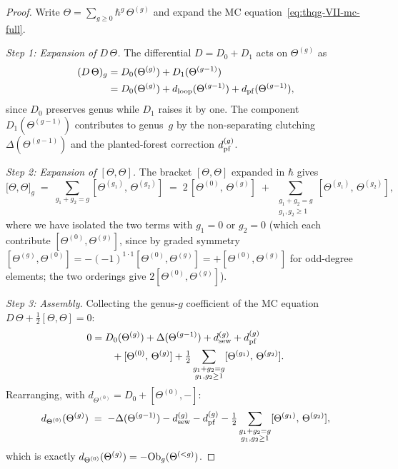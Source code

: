 \begin{proof}
Write $\Theta = \sum_{g \geq 0} \hbar^g\,\Theta^{(g)}$ and
expand the MC equation~\eqref{eq:thqg-VII-mc-full}.

\medskip\noindent\emph{Step 1: Expansion of $D\,\Theta$.}
The differential $D = D_0 + D_1$ acts on $\Theta^{(g)}$ as
\begin{align}
(D\,\Theta)_g
&= D_0(\Theta^{(g)}) + D_1(\Theta^{(g-1)})\notag\\
&= D_0(\Theta^{(g)})
 + d_{\mathrm{loop}}(\Theta^{(g-1)})
 + d_{\mathrm{pf}}(\Theta^{(g-1)}),
\label{eq:thqg-VII-D-theta-expand}
\end{align}
since $D_0$ preserves genus while $D_1$ raises it by one.
The component $D_1(\Theta^{(g-1)})$ contributes to genus~$g$
by the non-separating clutching $\Delta(\Theta^{(g-1)})$ and
the planted-forest correction $d_{\mathrm{pf}}^{(g)}$.

\medskip\noindent\emph{Step 2: Expansion of $[\Theta,\Theta]$.}
The bracket $[\Theta,\Theta]$ expanded in $\hbar$ gives
\begin{equation}\label{eq:thqg-VII-bracket-expand}
\bigl[\Theta,\Theta\bigr]_g
\;=\;
\sum_{g_1 + g_2 = g}
[\Theta^{(g_1)},\, \Theta^{(g_2)}]
\;=\;
2\,[\Theta^{(0)},\, \Theta^{(g)}]
\;+\;
\sum_{\substack{g_1 + g_2 = g \\ g_1, g_2 \geq 1}}
[\Theta^{(g_1)},\, \Theta^{(g_2)}],
\end{equation}
where we have isolated the two terms with $g_1 = 0$ or
$g_2 = 0$ (which each contribute $[\Theta^{(0)}, \Theta^{(g)}]$,
since by graded symmetry
$[\Theta^{(g)}, \Theta^{(0)}] = -(-1)^{1 \cdot 1}[\Theta^{(0)},
\Theta^{(g)}] = +[\Theta^{(0)}, \Theta^{(g)}]$
for odd-degree elements; the two orderings
give $2[\Theta^{(0)}, \Theta^{(g)}]$).

\medskip\noindent\emph{Step 3: Assembly.}
Collecting the genus-$g$ coefficient of the MC equation
$D\,\Theta + \tfrac{1}{2}[\Theta,\Theta] = 0$:
\begin{align}
0 &= D_0(\Theta^{(g)})
 + \Delta(\Theta^{(g-1)})
 + d_{\mathrm{sew}}^{(g)} + d_{\mathrm{pf}}^{(g)}
 \notag\\
 &\qquad
 + [\Theta^{(0)},\, \Theta^{(g)}]
 + \tfrac{1}{2}
 \sum_{\substack{g_1 + g_2 = g \\ g_1, g_2 \geq 1}}
 [\Theta^{(g_1)},\, \Theta^{(g_2)}].
\label{eq:thqg-VII-mc-g-assembled}
\end{align}
Rearranging, with $d_{\Theta^{(0)}} = D_0 +
[\Theta^{(0)}, -]$:
\begin{equation}\label{eq:thqg-VII-mc-g-rearranged}
d_{\Theta^{(0)}}(\Theta^{(g)})
\;=\;
-\Delta(\Theta^{(g-1)})
- d_{\mathrm{sew}}^{(g)} - d_{\mathrm{pf}}^{(g)}
- \tfrac{1}{2}
 \sum_{\substack{g_1 + g_2 = g \\ g_1, g_2 \geq 1}}
 [\Theta^{(g_1)},\, \Theta^{(g_2)}],
\end{equation}
which is exactly $d_{\Theta^{(0)}}(\Theta^{(g)}) = -\mathrm{Ob}_g(\Theta^{(<g)})$.


\end{proof}
